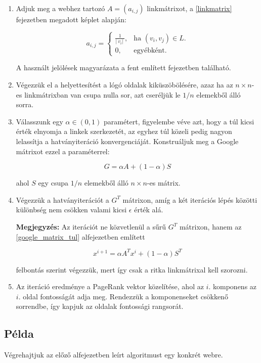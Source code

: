 \documentclass[12pt,a4paper]{article}
\begin{document}
\begin{enumerate}[label=(\Roman*)]
	\item Adjuk meg a webhez tartozó $A = (a_{i,j})$ linkmátrixot, a \ref{linkmatrix} fejezetben megadott képlet alapján: 
	
	\begin{equation*}
	a_{i,j}=\begin{cases}
	\frac{1}{ |\ v_i |\ }, & \text{ha $(v_i,v_j) \in L$}.\\
	0, & \text{egyébként}.
	\end{cases}
	\end{equation*}
	
	A használt jelölések magyarázata a fent említett fejezetben található.
	
	\item Végezzük el a helyettesítést a lógó oldalak kiküszöbölésére, azaz ha az $n \times n$-es linkmátrixban van csupa nulla sor, azt cseréljük le $1/n$ elemekből álló sorra.
	
	\item Válasszunk egy $\alpha \in (0,1)$ paramétert, figyelembe véve azt, hogy a túl kicsi érték elnyomja a linkek szerkezetét, az egyhez túl közeli pedig nagyon lelassítja a hatványiteráció konvergenciáját. Konstruáljuk meg a Google mátrixot ezzel a paraméterrel:
	
	\[G = \alpha A + (1-\alpha)S\]
	
	ahol $S$ egy csupa $1/n$ elemekből álló $n \times n$-es mátrix. 
	
	\item Végezzük a hatványiterációt a $G^T$ mátrixon, amíg a két iterációs lépés közötti különbség nem csökken valami kicsi $\epsilon$ érték alá. 
	
	\textbf{Megjegyzés:} Az iterációt ne közvetlenül a sűrű $G^T$ mátrixon, hanem az \ref{google_matrix_tul} alfejezetben említett
	
	\[ x^{i+1} = \alpha A^T x^i + (1-\alpha) S^T \] 
	
	felbontás szerint végezzük, mert így csak a ritka linkmátrixal kell szorozni.
	
	\item Az iteráció eredménye a PageRank vektor közelítése, ahol az $i.$ komponens az $i.$ oldal fontosságát adja meg. Rendezzük a komponenseket csökkenő sorrendbe, így kapjuk az oldalak fontossági rangsorát.
	
\end{enumerate}

\subsection{Példa}

Végrehajtjuk az előző alfejezetben leírt algoritmust egy konkrét webre.



\end{document}

